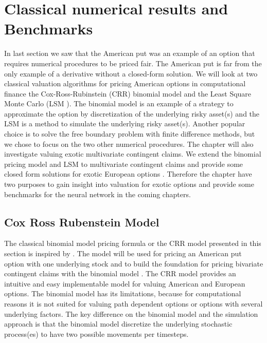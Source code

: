 \chapter{Classical numerical results and Benchmarks} %

\label{Chapter3} %

In last section we saw that the American put was an example of an option that requires numerical procedures to be priced fair. The American put is far from the only example of a derivative without a closed-form solution. We will look at two classical valuation algorithms for pricing American options in computational finance the Cox-Ross-Rubinstein (CRR) binomial model \parencite{CRR} and the Least Square Monte Carlo (LSM \parencite{LSM}). The binomial model is an example of a strategy to approximate the option by discretization of the underlying risky asset(s) and the LSM is a method to simulate the underlying risky asset(s). Another popular choice is to solve the free boundary problem with finite difference methods, but we chose to focus on the two other numerical procedures. The chapter will also investigate valuing exotic multivariate contingent claims. We extend the binomial pricing model \parencite{NEK,BEG} and LSM to multivariate contingent claims and provide some closed form solutions for exotic European options \parencite{Johnson87, Ouwehand2006}. Therefore the chapter have two purposes to gain insight into valuation for exotic options and provide some benchmarks for the neural network in the coming chapters.

\section{Cox Ross Rubenstein Model}\label{CRR}
The classical binomial model pricing formula or the CRR model presented in this section is inspired by \parencite{CRR,Hull,finKont}. The model will be used for pricing an American put option with one underlying stock and to build the foundation for pricing bivariate contingent claims with the binomial model \parencite{BEG}. The CRR model provides an intuitive and easy implementable model for valuing American and European options. The binomial model has its limitations, because for computational reasons it is not suited for valuing path dependent options or options with several underlying factors. The key difference on the binomial model and the simulation approach is that the binomial model discretize the underlying stochastic process(es) to have two possible movements per timesteps. \\

